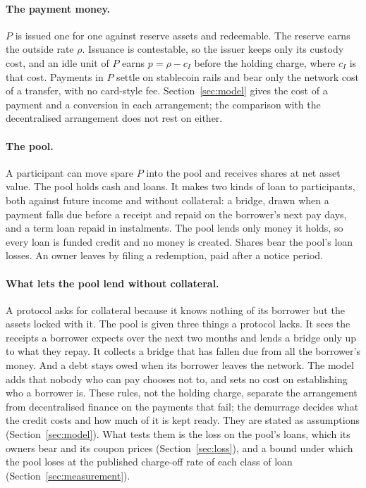 \documentclass[10pt,a4paper]{article}
\theoremstyle{remark}
\begin{document}
\paragraph{The payment money.}
\(P\) is issued one for one against reserve assets and redeemable. The
reserve earns the outside rate \(\rho\). Issuance is contestable, so the
issuer keeps only its custody cost, and an idle unit of \(P\) earns
\(p=\rho-c_I\) before the holding charge, where \(c_I\) is that cost.
Payments in \(P\) settle on stablecoin rails and bear only the network cost
of a transfer, with no card-style fee. Section~\ref{sec:model} gives the cost
of a payment and a conversion in each arrangement; the comparison with the
decentralised arrangement does not rest on either.

\paragraph{The pool.}
A participant can move spare \(P\) into the pool and receives shares at net
asset value. The pool holds cash and loans. It makes two kinds of loan to
participants, both against future income and without collateral: a bridge,
drawn when a payment falls due before a receipt and repaid on the borrower's
next pay days, and a term loan repaid in instalments. The pool lends only
money it holds, so every loan is funded credit and no money is created.
Shares bear the pool's loan losses. An owner leaves by filing a redemption,
paid after a notice period.

\paragraph{What lets the pool lend without collateral.}
A protocol asks for collateral because it knows nothing of its borrower but
the assets locked with it. The pool is given three things a protocol lacks.
It sees the receipts a borrower expects over the next two months and lends a
bridge only up to what they repay. It collects a bridge that has fallen due
from all the borrower's money. And a debt stays owed when its borrower leaves
the network. The model adds that nobody who can pay chooses not to, and
sets no cost on establishing who a borrower is. These rules, not the
holding charge, separate the arrangement from decentralised finance
on the payments that fail; the demurrage decides what the credit costs and how
much of it is kept ready. They are stated as assumptions
(Section~\ref{sec:model}). What tests them is the loss on the pool's loans,
which its owners bear and its coupon prices (Section~\ref{sec:loss}), and a
bound under which the pool loses at the published charge-off rate of each
class of loan (Section~\ref{sec:measurement}).
\end{document}
